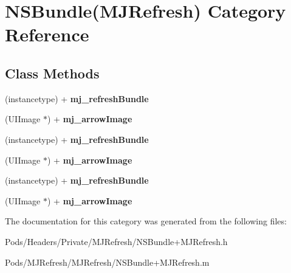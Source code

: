 \hypertarget{category_n_s_bundle_07_m_j_refresh_08}{}\section{N\+S\+Bundle(M\+J\+Refresh) Category Reference}
\label{category_n_s_bundle_07_m_j_refresh_08}
\subsection*{Class Methods}
\begin{DoxyCompactItemize}
\item 
\mbox{\label{category_n_s_bundle_07_m_j_refresh_08_af059fa9f9c8e746f995a60472bf3c18b}} 
(instancetype) + {\bfseries mj\+\_\+refresh\+Bundle}
\item 
\mbox{\label{category_n_s_bundle_07_m_j_refresh_08_a405e1f9ae99ba52d78dad55a29c55fe1}} 
(U\+I\+Image $\ast$) + {\bfseries mj\+\_\+arrow\+Image}
\item 
\mbox{\label{category_n_s_bundle_07_m_j_refresh_08_af059fa9f9c8e746f995a60472bf3c18b}} 
(instancetype) + {\bfseries mj\+\_\+refresh\+Bundle}
\item 
\mbox{\label{category_n_s_bundle_07_m_j_refresh_08_a405e1f9ae99ba52d78dad55a29c55fe1}} 
(U\+I\+Image $\ast$) + {\bfseries mj\+\_\+arrow\+Image}
\item 
\mbox{\label{category_n_s_bundle_07_m_j_refresh_08_af059fa9f9c8e746f995a60472bf3c18b}} 
(instancetype) + {\bfseries mj\+\_\+refresh\+Bundle}
\item 
\mbox{\label{category_n_s_bundle_07_m_j_refresh_08_a405e1f9ae99ba52d78dad55a29c55fe1}} 
(U\+I\+Image $\ast$) + {\bfseries mj\+\_\+arrow\+Image}
\end{DoxyCompactItemize}


The documentation for this category was generated from the following files\+:\begin{DoxyCompactItemize}
\item 
Pods/\+Headers/\+Private/\+M\+J\+Refresh/N\+S\+Bundle+\+M\+J\+Refresh.\+h\item 
Pods/\+M\+J\+Refresh/\+M\+J\+Refresh/N\+S\+Bundle+\+M\+J\+Refresh.\+m\end{DoxyCompactItemize}
